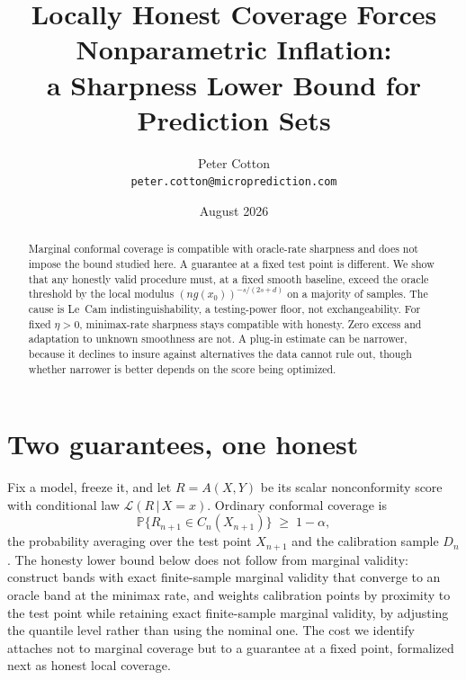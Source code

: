 \documentclass[11pt]{article}
\title{Locally Honest Coverage Forces Nonparametric Inflation:\\
a Sharpness Lower Bound for Prediction Sets}
\author{Peter Cotton\\\texttt{peter.cotton@microprediction.com}}
\date{August 2026}
\theoremstyle{definition}
\theoremstyle{remark}
\newcommand{\Prob}{\mathbb{P}}
\newcommand{\given}{\,|\,}
\begin{document}
\maketitle

\begin{abstract}
Marginal conformal coverage is compatible with oracle-rate sharpness and does not impose
the bound studied here. A guarantee at a fixed test point is different. We show that any
honestly valid procedure must, at a fixed smooth baseline, exceed the oracle threshold by
the local modulus $(n g(x_0))^{-s/(2s+d)}$ on a majority of samples. The cause is Le~Cam
indistinguishability, a testing-power floor, not exchangeability. For fixed $\eta>0$,
minimax-rate sharpness stays compatible with honesty. Zero excess and adaptation to unknown
smoothness are not. A plug-in estimate can be narrower, because it declines to insure
against alternatives the data cannot rule out, though whether narrower is better depends on
the score being optimized.
\end{abstract}

\section{Two guarantees, one honest}

Fix a model, freeze it, and let $R = A(X,Y)$ be its scalar nonconformity score with
conditional law $\mathcal{L}(R\given X=x)$. Ordinary conformal coverage is
\begin{equation}\label{eq:marginal}
  \Prob\big\{ R_{n+1} \in C_n(X_{n+1}) \big\} \;\ge\; 1-\alpha ,
\end{equation}
the probability averaging over the test point $X_{n+1}$ and the calibration sample $D_n$.
The honesty lower bound below does not follow from marginal validity:
\citet{lei2014distribution} construct bands with exact finite-sample marginal validity that
converge to an oracle band at the minimax rate, and \citet{guan2023localized} weights
calibration points by proximity to the test point while retaining exact finite-sample marginal
validity, by adjusting the quantile level rather than using the nominal one. The cost we identify attaches not to
marginal coverage but to a guarantee at a fixed point, formalized next as honest local
coverage.
\end{document}
